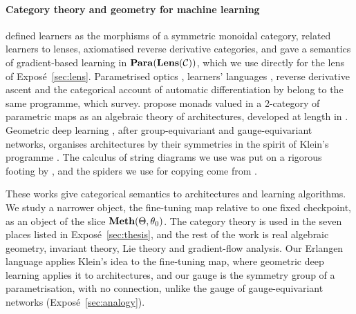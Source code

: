\paragraph{Category theory and geometry for machine learning}
\citet{fong2017backprop} defined learners as the morphisms of a symmetric monoidal category, \citet{fong2019lenses} related learners to lenses, \citet{cockett2019reverse} axiomatised reverse derivative categories, and \citet{cruttwell2021categorical} gave a semantics of gradient-based learning in $\mathbf{Para}(\mathbf{Lens}(\mathcal C))$, which we use directly for the lens of Exposé~\ref{sec:lens}. Parametrised optics \citep{capucci2021foundations}, learners' languages \citep{xspivak2022learners}, reverse derivative ascent \citep{xwilson2021reverse} and the categorical account of automatic differentiation by \citet{xelliott2018simple} belong to the same programme, which \citet{shiebler2021category} survey. \citet{gavranovic2024position} propose monads valued in a 2-category of parametric maps as an algebraic theory of architectures, developed at length in \citet{gavranovic2024fundamental}. Geometric deep learning \citep{bronstein2021geometric}, after group-equivariant \citep{xcohen2016group} and gauge-equivariant \citep{xcohen2019gauge} networks, organises architectures by their symmetries in the spirit of Klein's programme \citep{xklein1872vergleichende}. The calculus of string diagrams we use was put on a rigorous footing by \citet{xjoyal1991geometry}, and the spiders we use for copying come from \citet{xcoecke2013new}.

These works give categorical semantics to architectures and learning algorithms. We study a narrower object, the fine-tuning map relative to one fixed checkpoint, as an object of the slice $\mathbf{Meth}(\Theta,\theta_0)$. The category theory is used in the seven places listed in Exposé~\ref{sec:thesis}, and the rest of the work is real algebraic geometry, invariant theory, Lie theory and gradient-flow analysis. Our Erlangen language applies Klein's idea to the fine-tuning map, where geometric deep learning applies it to architectures, and our gauge is the symmetry group of a parametrisation, with no connection, unlike the gauge of gauge-equivariant networks (Exposé~\ref{sec:analogy}).
